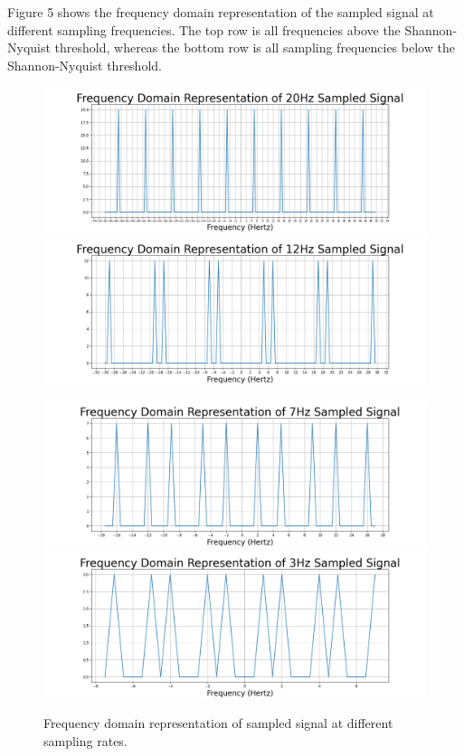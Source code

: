 \documentclass{article}
\begin{document}
Figure 5 shows the frequency domain representation of the sampled signal at different sampling frequencies. 
The top row is all frequencies above the Shannon-Nyquist threshold, whereas the bottom row is all sampling frequencies below the Shannon-Nyquist threshold.
\begin{figure}[H]
    \centering
    \begin{minipage}{0.5\textwidth}
        \centering
        \includegraphics[width=\linewidth]{images/freqdom_20hz.png}
        \includegraphics[width=\linewidth]{images/freqdom_12hz.png}
        \\[0.5em] 
    \end{minipage}
    
    \begin{minipage}{0.5\textwidth}
        \centering
        \includegraphics[width=\linewidth]{images/freqdom_7hz.png}
        \includegraphics[width=\linewidth]{images/freqdom_3hz.png}
    \end{minipage}
    
    \caption{Frequency domain representation of sampled signal at different sampling rates.}
\end{figure}
\end{document}

